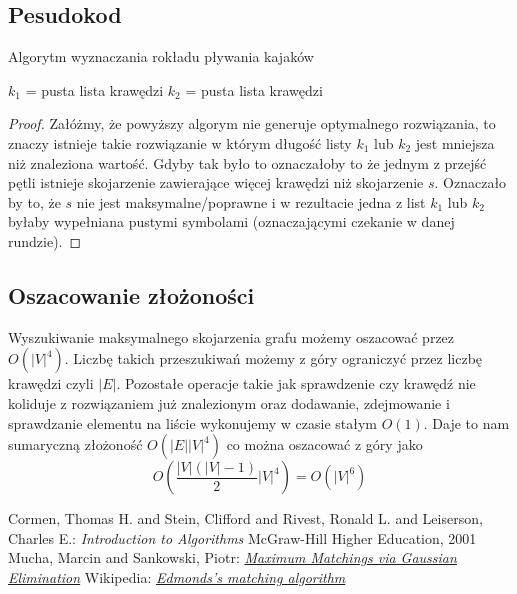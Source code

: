 \documentclass{llncs}
\begin{document}
\subsection{Pesudokod}
\begin{algorithm}[H]
 \caption{Algorytm wyznaczania rokładu pływania kajaków}
 $k_1$ = pusta lista krawędzi\;
 $k_2$ = pusta lista krawędzi\;
\end{algorithm}

\begin{proof}
Załóżmy, że powyższy algorym nie generuje optymalnego rozwiązania, to znaczy istnieje
takie rozwiązanie w którym długość listy $k_1$ lub $k_2$ jest mniejsza niż znaleziona wartość.
Gdyby tak było to oznaczałoby to że jednym z przejść pętli istnieje
skojarzenie zawierające więcej krawędzi niż skojarzenie $s$. 
Oznaczało by to, że $s$ nie jest maksymalne/poprawne i w rezultacie jedna z list $k_1$ lub $k_2$ byłaby wypełniana pustymi
symbolami (oznaczającymi czekanie w danej rundzie).
\end{proof}

\subsection{Oszacowanie złożoności}

Wyszukiwanie maksymalnego skojarzenia grafu możemy oszacować przez $O(|V|^4)$\cite{wiki-blossom}.
Liczbę takich przeszukiwań możemy z góry ograniczyć przez liczbę krawędzi czyli $|E|$. 
Pozostałe operacje takie jak sprawdzenie czy krawędź nie koliduje z rozwiązaniem już znalezionym
oraz dodawanie, zdejmowanie i sprawdzanie elementu na liście wykonujemy w czasie stałym $O(1)$.
Daje to nam sumaryczną złożoność $O(|E||V|^4)$ co można oszacować z góry jako 
\begin{equation}
O(\frac{|V|(|V|-1)}{2} |V|^4) = O(|V|^6)
\end{equation}

%
%
\begin{thebibliography}{4}
%
Cormen, Thomas H. and Stein, Clifford and Rivest, Ronald L. and Leiserson, Charles E.:
\textsl{Introduction to Algorithms}
McGraw-Hill Higher Education, 2001
Mucha, Marcin and Sankowski, Piotr:
\textsl{\href{http://www.mimuw.edu.pl/~mucha/pub/mucha_sankowski_focs04.pdf}{Maximum Matchings via Gaussian Elimination}}
Wikipedia:
\textsl{\href{http://en.wikipedia.org/wiki/Blossom_algorithm}{Edmonds's matching algorithm}}
\end{thebibliography}
\end{document}
